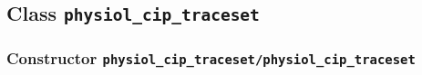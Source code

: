 \subsection{Class \texttt{physiol\_cip\_traceset}}%
%
\label{ref_physiol_cip_traceset}%
\hypertarget{ref_physiol_cip_traceset}{}%
\subsubsection[Constructor \texttt{physiol\_cip\_traceset}]{Constructor \texttt{physiol\_cip\_traceset/physiol\_cip\_traceset}}%
%
\label{ref_physiol_cip_traceset__physiol_cip_traceset}%
\hypertarget{ref_physiol_cip_traceset__physiol_cip_traceset}{}%
